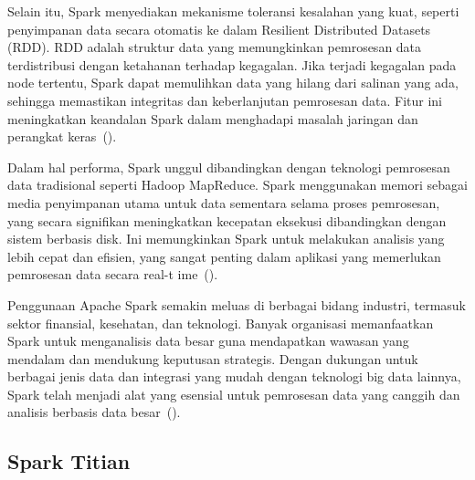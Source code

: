 Selain itu, Spark menyediakan mekanisme toleransi kesalahan yang kuat, seperti penyimpanan data secara otomatis ke dalam Resilient Distributed Datasets (RDD). RDD adalah struktur data yang memungkinkan pemrosesan data terdistribusi dengan ketahanan terhadap kegagalan. Jika terjadi kegagalan pada node tertentu, Spark dapat memulihkan data yang hilang dari salinan yang ada, sehingga memastikan integritas dan keberlanjutan pemrosesan data. Fitur ini meningkatkan keandalan Spark dalam menghadapi masalah jaringan dan perangkat keras~(\cite{zhang2020}).

Dalam hal performa, Spark unggul dibandingkan dengan teknologi pemrosesan data tradisional seperti Hadoop MapReduce. Spark menggunakan memori sebagai media penyimpanan utama untuk data sementara selama proses pemrosesan, yang secara signifikan meningkatkan kecepatan eksekusi dibandingkan dengan sistem berbasis disk. Ini memungkinkan Spark untuk melakukan analisis yang lebih cepat dan efisien, yang sangat penting dalam aplikasi yang memerlukan pemrosesan data secara real-t
ime~(\cite{zhang2021}).

Penggunaan Apache Spark semakin meluas di berbagai bidang industri, termasuk sektor finansial, kesehatan, dan teknologi. Banyak organisasi memanfaatkan Spark untuk menganalisis data besar guna mendapatkan wawasan yang mendalam dan mendukung keputusan strategis. Dengan dukungan untuk berbagai jenis data dan integrasi yang mudah dengan teknologi big data lainnya, Spark telah menjadi alat yang esensial untuk pemrosesan data yang canggih dan analisis berbasis data besar~(\cite{sharma2022}).

\subsection{Spark Titian}

